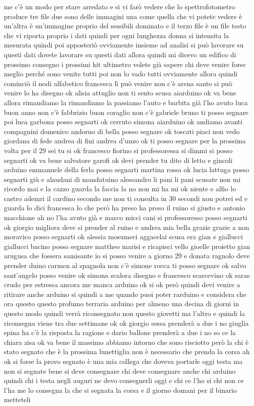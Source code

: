 me c'è un modo per stare arredato e si vi farò vedere che lo spettrofotometro produce tre file due sono delle immagini una come quella che vi potete vedere è un'altra è un'immagine proprio del sessibili dominato e il terzo file è un file testo che vi riporta proprio i dati quindi per ogni lunghezza donna si intensita la mesurata quindi poi apposteriò ovviamente insieme ad analisi si può lavorare su questi dati dovete lavorare su questi dati allora quindi mi dicevo un edifico di prossimo consegno i prossimi kit ultimetro volete già sapere chi deve venire forse meglio perché sono venite tutti poi non lo vado tutti ovviamente allora quindi cominciò il nodi alfabetico francesca lì può venire non c'è arena santo si può venire lo ha disegno ok alisia attuglio non ti sento scusa aiarduino ok va bene allora rimandiamo la rimandiamo la passiamo l'auto e barbita già l'ho avuto luca buon anno non c'è fabbrizio buon coraglio non c'è gabriele bruno ti posso segnare poi luca garbona posso segnarti ok cerruto simona aiarduino ok andiamo avanti compagnini domenico andorno di bella posso segnare ok toscati piaci non vedo giordana di fede andrea di fini andrea d'unzo ok ti posso segnare per la prossima volta per il 29 sei tu si ok francesco fiorino si professoressa si dimmi si posso segnarti ok va bene salvatore garofi ok devi prender tu dito di letto e gincoli arduino emmanuele della ferla posso segnarti martina rossa ok lucia lattuga posso segnarti giù e alaudani di mandatuino alessandro li pani li pani scusate non mi ricordo mai e la cazzo guarda la faccia la no non mi ha mi ok niente e alfio lo castro ademri il cardino secondo me non ti consulta in 30 secondi non potrei ed e guarda lo dici francesca lo che però ha preso ha preso il ruino si giusto e antonio macchione ah no l'ha avuto già e marco micci cani si professoresso posso segnarti ok giorgio migliora deve si prender al ruino e andrea mia bella grazie grazie a non moravico posso segnarti ok alessia mosumeci aggacelai scusa era gian e giallucci giallucci bacino posso segnare mattheo marisi e ricapisci vello gioelle proietto gian arugusa che fossera samisante io si posso venire a giorno 29 e donata ragnolo deve prender duino carmen al spagnola non c'è simone rocca ti posso segnare ok salvo sant'angelo posso venire ok simona scalora disegno e francesco scarcevino ok saras crudo per estressa ancora me manca arduino ok si ok però quindi devi venire a ritirare anche arduino si quindi a me quando puoi poter rarduino e considera che ora questo questo profumo terraria arduino per almeno una decina di giorni in questo modo quindi verrà riconsegnato non questo giovetti ma l'altro e quindi la riconsegna viene tra due settimane ok ok giorgio sessa prenderà a due i no giuglia spina ha c'è la risposta la ragione e dario ballone prenderà a due i no so ce la chiara zisa ok va bene il massimo abbiamo intorno che sono risciotto però la chi è stato segnato che è la prossima lunettiglia non è necessario che prenda la corsa ah ok si forse la provo segnato è una mia collega che doveva portarle oggi testa ma non si segnate bene si deve consegnare chi deve consegnare anche chi arduino quindi chi i testa negli auguri ne devo consegnerli oggi e chi ce l'ho si chi non ce l'ha me lo consegna la che si segnata la corsa e il giorno domani per il binario metteteli 